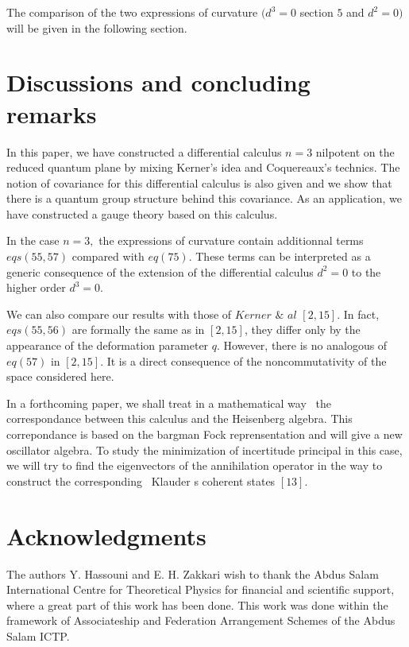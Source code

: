 \documentclass[a4paper,12pt,thmsa]{article}
\begin{document}
The comparison of the two expressions of curvature $(d^3=0$ section $5$ and $%
d^2=0)$ will be given in the following section.

\section{Discussions and concluding remarks}

In this paper, we have constructed a differential calculus $n=3$ nilpotent
on the reduced quantum plane by mixing Kerner's idea and Coquereaux's
technics. The notion of covariance for this differential calculus is also
given and we show that there is a quantum group structure behind this
covariance. As an application, we have constructed a gauge theory based on
this calculus.

In the case $n=3,$ the expressions of curvature contain additionnal terms $%
eqs(55,57)$ compared with $eq(75).$ These terms can be interpreted as a
generic consequence of the extension of the differential calculus $d^2=0$ to
the higher order $d^3=0.$

We can also compare our results with those of $Kerner$ $\&$ $al$ $[2,15].$
In fact, $eqs(55,56)$ are formally the same as in $[2,15]$, they differ only
by the appearance of the deformation parameter $q$. However, there is no
analogous of $eq(57)$ in $[2,15]$. It is a direct consequence of the
noncommutativity of the space considered here.

In a forthcoming paper, we shall treat in a mathematical way \ the
correspondance between this calculus and the Heisenberg algebra. This
correpondance is based on the bargman Fock reprensentation and will give a
new oscillator algebra. To study the minimization of incertitude principal
in this case, we will try to find the eigenvectors of the annihilation
operator in the way to construct the corresponding \ Klauder s coherent
states $\left[ 13\right] $.

\vspace{0.5cm}

\section*{Acknowledgments}

The authors Y. Hassouni and E. H. Zakkari wish to thank the Abdus Salam
International Centre for Theoretical Physics for financial and scientific
support, where a great part of this work has been done. This work was done
within the framework of Associateship and Federation Arrangement  Schemes of
the Abdus Salam ICTP.\textbf{\ }
\end{document}
